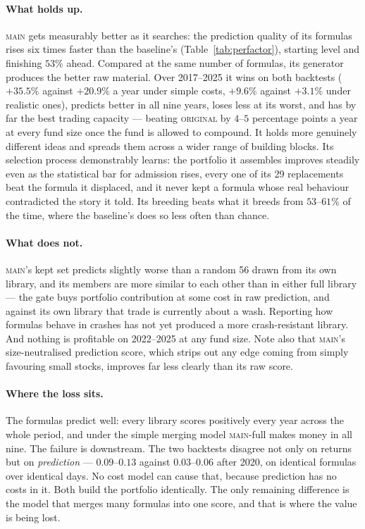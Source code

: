 \documentclass[11pt]{article}
\newcommand{\main}{\textsc{main}}
\newcommand{\orig}{\textsc{original}}
\begin{document}
\paragraph{What holds up.}
\main{} gets measurably better as it searches: the prediction quality of its formulas
rises six times faster than the baseline's (Table~\ref{tab:perfactor}), starting level
and finishing $53\%$ ahead. Compared at the same number of formulas, its generator
produces the better raw material. Over 2017--2025 it wins on both backtests ($+35.5\%$ against $+20.9\%$ a
year under simple costs, $+9.6\%$ against $+3.1\%$ under realistic ones), predicts
better in all nine years, loses less at its worst, and has by far the best trading
capacity --- beating \orig{} by $4$--$5$ percentage points a year at every fund size
once the fund is allowed to compound. It holds more genuinely different ideas and spreads them
across a wider range of building blocks. Its selection process demonstrably learns:
the portfolio it assembles improves steadily even as the statistical bar for admission
rises, every one of its 29 replacements beat the formula it displaced, and it never
kept a formula whose real behaviour contradicted the story it told. Its breeding beats
what it breeds from $53$--$61\%$ of the time, where the baseline's does so less often
than chance.

\paragraph{What does not.}
\main{}'s kept set predicts slightly worse than a random 56 drawn from its own library,
and its members are more similar to each other than in either full library --- the gate
buys portfolio contribution at some cost in raw prediction, and against its own library
that trade is currently about a wash. Reporting how formulas behave in crashes has not
yet produced a more crash-resistant library. And nothing is profitable on 2022--2025 at
any fund size. Note also that \main{}'s size-neutralised prediction score, which strips
out any edge coming from simply favouring small stocks, improves far less clearly than
its raw score.

\paragraph{Where the loss sits.}
The formulas predict well: every library scores positively every year across the whole
period, and under the simple merging model \main{}-full makes money in all nine. The
failure is downstream. The two backtests disagree not only on returns but on
\emph{prediction} --- $0.09$--$0.13$ against $0.03$--$0.06$ after 2020, on identical
formulas over identical days. No cost model can cause that, because prediction has no
costs in it. Both build the portfolio identically. The only remaining difference is
the model that merges many formulas into one score, and that is where the value is
being lost.
\end{document}
